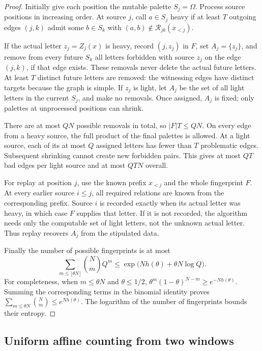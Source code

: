 \begin{proof}
Initially give each position the mutable palette $S_j=\Omega$.
Process source positions in increasing order.  At source $j$, call
$a\in S_j$ heavy if at least $T$ outgoing edges $(j,k)$ admit some
$b\in S_k$ with $(a,b)\notin\mathcal R_{jk}(x_{<j})$.

If the actual letter $z_j=Z_j(x)$ is heavy, record $(j,z_j)$ in
$F$, set $A_j=\{z_j\}$, and remove from every future $S_k$ all
letters forbidden with source $z_j$ on the edge $(j,k)$, if that edge
exists.  These removals never delete the actual future letters.
At least $T$ distinct future letters are removed: the witnessing
edges have distinct targets because the graph is simple.
If $z_j$ is light, let $A_j$ be the set of all light letters in
the current $S_j$, and make no removals.  Once assigned, $A_j$ is
fixed; only palettes at unprocessed positions can shrink.

There are at most $QN$ possible removals in total, so
$|F|T\le QN$.  On every edge from a heavy source, the full product
of the final palettes is allowed.  At a light source, each of its
at most $Q$ assigned letters has fewer than $T$ problematic edges.
Subsequent shrinking cannot create new forbidden pairs.  This gives
at most $QT$ bad edges per light source and at most $QTN$ overall.

For replay at position $j$, use the known prefix $x_{<j}$ and the
whole fingerprint $F$.  At every earlier source $i\le j$, all
required relations are known from the corresponding prefix.  Source
$i$ is recorded exactly when its actual letter was heavy, in which
case $F$ supplies that letter.  If it is not recorded, the algorithm
needs only the computable set of light letters, not the unknown
actual letter.  Thus replay recovers $A_j$ from the stipulated data.

Finally the number of possible fingerprints is at most
\[
 \sum_{m\le\lfloor\theta N\rfloor}\binom Nm Q^m
 \le\exp\bigl(Nh(\theta)+\theta N\log Q\bigr).
\]
For completeness, when $m\le\theta N$ and $\theta\le1/2$,
$\theta^m(1-\theta)^{N-m}\ge e^{-Nh(\theta)}$.
Summing the corresponding terms in the binomial identity proves
$\sum_{m\le\theta N}\binom Nm\le e^{Nh(\theta)}$.
The logarithm of the number of fingerprints bounds their entropy.
\end{proof}

\subsection{Uniform affine counting from two windows}

